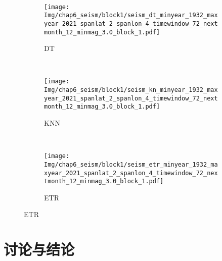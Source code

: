 \begin{figure}[!htbp]
\begin{subfigure}[b]{0.45\textwidth}
    \vspace{-1cm}
    \label{fig:seism_gbr_minyear_1932_maxyear_2021_spanlat_2_spanlon_4_timewindow_72_nextmonth_12_minmag_3.0_block_1}
  \end{subfigure}
  ~
  \begin{subfigure}[b]{0.45\textwidth}
    \caption{DT}
    \vspace{-0.2cm}
    \texttt{[image: Img/chap6\_seism/block1/seism\_dt\_minyear\_1932\_maxyear\_2021\_spanlat\_2\_spanlon\_4\_timewindow\_72\_nextmonth\_12\_minmag\_3.0\_block\_1.pdf]}
    \vspace{-1cm}
    \label{fig:seism_dt_minyear_1932_maxyear_2021_spanlat_2_spanlon_4_timewindow_72_nextmonth_12_minmag_3.0_block_1}
  \end{subfigure}
  \\
  \begin{subfigure}[b]{0.45\textwidth}
    \caption{KNN}
    \vspace{-0.2cm}
    \texttt{[image: Img/chap6\_seism/block1/seism\_kn\_minyear\_1932\_maxyear\_2021\_spanlat\_2\_spanlon\_4\_timewindow\_72\_nextmonth\_12\_minmag\_3.0\_block\_1.pdf]}
    \vspace{-1cm}
    \label{fig:seism_knn_minyear_1932_maxyear_2021_spanlat_2_spanlon_4_timewindow_72_nextmonth_12_minmag_3.0_block_1}
  \end{subfigure}
  ~
  \begin{subfigure}[b]{0.45\textwidth}
    \caption{ETR}
    \vspace{-0.2cm}
    \texttt{[image: Img/chap6\_seism/block1/seism\_etr\_minyear\_1932\_maxyear\_2021\_spanlat\_2\_spanlon\_4\_timewindow\_72\_nextmonth\_12\_minmag\_3.0\_block\_1.pdf]}
    \vspace{-1cm}
    \label{fig:seism_etr_minyear_1932_maxyear_2021_spanlat_2_spanlon_4_timewindow_72_nextmonth_12_minmag_3.0_block_1}
  \end{subfigure}
  \label{fig:seism_minyear_1932_maxyear_2021_spanlat_2_spanlon_4_timewindow_72_nextmonth_12_minmag_3.0_block_1}
\end{figure}


\section{讨论与结论}\label{sec:seism_conclusion}


